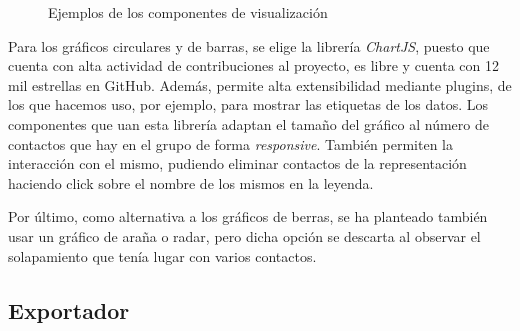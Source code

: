 \begin{figure}[h]
	
	\qquad
	\caption{Ejemplos de los componentes de visualización}
	\label{fig:chap4:visualization_examples}
\end{figure}

Para los gráficos circulares y de barras, se elige la librería \textit{ChartJS}, puesto que cuenta con alta actividad de contribuciones al proyecto, es libre y cuenta con 12 mil estrellas en GitHub. Además, permite alta extensibilidad mediante plugins, de los que hacemos uso, por ejemplo, para mostrar las etiquetas de los datos. Los componentes que uan esta librería adaptan el tamaño del gráfico al número de contactos que hay en el grupo de forma \textit{responsive}. También permiten la interacción con el mismo, pudiendo eliminar contactos de la representación haciendo click sobre el nombre de los mismos en la leyenda.

Por último, como alternativa a los gráficos de berras, se ha planteado también usar un gráfico de araña o radar, pero dicha opción se descarta al observar el solapamiento que tenía lugar con varios contactos.


\subsection{Exportador}

